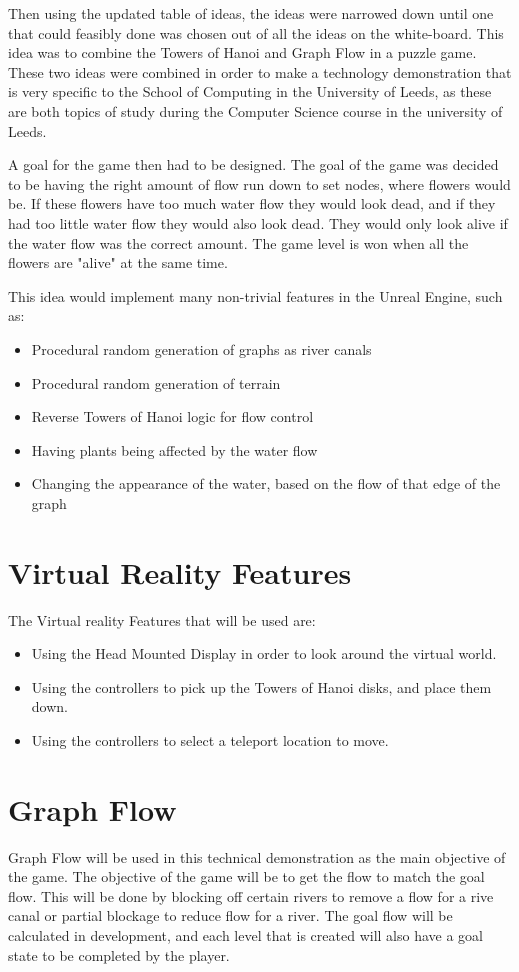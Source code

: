 Then using the updated table of ideas, the ideas were narrowed down until one that could feasibly done was chosen out of all the ideas on the white-board. This idea was to combine the Towers of Hanoi and Graph Flow in a puzzle game. These two ideas were combined in order to make a technology demonstration that is very specific to the School of Computing in the University of Leeds, as these are both topics of study during the Computer Science course in the university of Leeds.
\newline
\par
A goal for the game then had to be designed. The goal of the game was decided to be having the right amount of flow run down to set nodes, where flowers would be. If these flowers have too much water flow they would look dead, and if they had too little water flow they would also look dead. They would only look alive if the water flow was the correct amount. The game level is won when all the flowers are "alive" at the same time.
\newline
\par
This idea would implement many non-trivial features in the Unreal Engine, such as:
\begin{itemize}
	\item Procedural random generation of graphs as river canals
	\item Procedural random generation of terrain
	\item Reverse Towers of Hanoi logic for flow control
	\item Having plants being affected by the water flow
	\item Changing the appearance of the water, based on the flow of that edge of the graph
\end{itemize}


\section{Virtual Reality Features}
The Virtual reality Features that will be used are:
\begin{itemize}
	\item Using the Head Mounted Display in order to look around the virtual world.
	\item Using the controllers to pick up the Towers of Hanoi disks, and place them down.
	\item Using the controllers to select a teleport location to move.
\end{itemize}

\section{Graph Flow}
Graph Flow will be used in this technical demonstration as the main objective of the game. The objective of the game will be to get the flow to match the goal flow. This will be done by blocking off certain rivers to remove a flow for a rive canal or partial blockage to reduce flow for a river. The goal flow will be calculated in development, and each level that is created will also have a goal state to be completed by the player.

